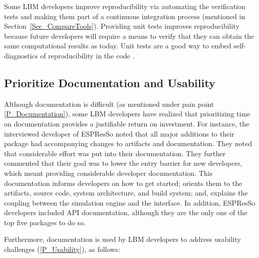 \documentclass[final, 3p, times, authoryear]{elsarticle}
\begin{document}
Some LBM developers improve reproducibility via automating the verification
tests and making them part of a continuous integration process (mentioned in
Section~\ref{Sec_CompareTools}).  Providing unit tests improves reproducibility
because future developers will require a means to verify that they can obtain
the same computational results as today.  Unit tests are a good way to embed
self-diagnostics of reproducibility in the code \citep{BenureauAndRougier2017}.

\subsection{Prioritize Documentation and Usability} \label{Sec_RecommendDoc}

Although documentation is difficult (as mentioned under pain point
\ref{P_Documentation}), some LBM developers have realized that prioritizing time
on documentation provides a justifiable return on investment. For instance, the
interviewed developer of ESPResSo noted that all major additions to their
package had accompanying changes to artifacts and documentation. They noted that
considerable effort was put into their documentation. They further commented
that their goal was to lower the entry barrier for new developers, which meant
providing considerable developer documentation. This documentation informs
developers on how to get started; orients them to the artifacts, source code,
system architecture, and build system; and, explains the coupling between
the simulation engine and the interface. In addition, ESPResSo developers
included API documentation, although they are the only one of the top five
packages to do so.

Furthermore, documentation is used by LBM developers to address usability
challenges (\ref{P_Usability}), as follows:
\end{document}
